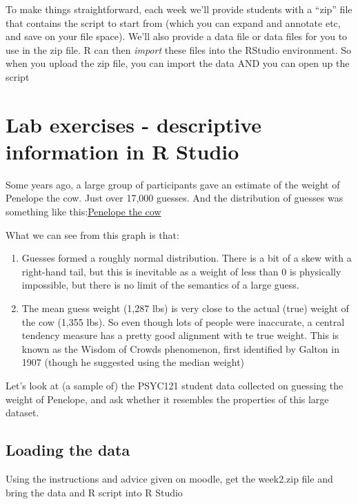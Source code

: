 \documentclass[
]{book}
\providecommand{\tightlist}{%
  \setlength{\itemsep}{0pt}\setlength{\parskip}{0pt}}
\begin{document}
To make things straightforward, each week we'll provide students with a ``zip'' file that contains the script to start from (which you can expand and annotate etc, and save on your file space). We'll also provide a data file or data files for you to use in the zip file. R can then \emph{import} these files into the RStudio environment. So when you upload the zip file, you can import the data AND you can open up the script

\hypertarget{lab-exercises---descriptive-information-in-r-studio}{%
\section{Lab exercises - descriptive information in R Studio}\label{lab-exercises---descriptive-information-in-r-studio}}

Some years ago, a large group of participants gave an estimate of the weight of Penelope the cow. Just over 17,000 guesses. And the distribution of guesses was something like this:\href{penelope.png}{Penelope the cow}

What we can see from this graph is that:

\begin{enumerate}
\def\labelenumi{\arabic{enumi}.}
\tightlist
\item
  Guesses formed a roughly normal distribution. There is a bit of a skew with a right-hand tail, but this is inevitable as a weight of less than 0 is physically impossible, but there is no limit of the semantics of a large guess.
\item
  The mean guess weight (1,287 lbs) is very close to the actual (true) weight of the cow (1,355 lbs). So even though lots of people were inaccurate, a central tendency measure has a pretty good alignment with te true weight. This is known as the Wisdom of Crowds phenomenon, first identified by Galton in 1907 (though he suggested using the median weight)
\end{enumerate}

Let's look at (a sample of) the PSYC121 student data collected on guessing the weight of Penelope, and ask whether it resembles the properties of this large dataset.

\hypertarget{loading-the-data}{%
\subsection{Loading the data}\label{loading-the-data}}

Using the instructions and advice given on moodle, get the week2.zip file and bring the data and R script into R Studio
\end{document}
